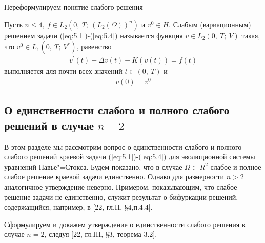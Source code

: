 Переформулируем понятие слабого решения
\begin{definition}
    Пусть $n \le 4, \ f \in L_2(0, \ T; \ (L_2(\Omega))^n)$ и $v^0 \in H$. Слабым (вариационным) решением задачи (\ref{eq:5.1})-(\ref{eq:5.4}) называется функция
    $v \in L_2(0, \ T; \ V)$ такая, что $v^0 \in L_1(0, \ T; \ V^\ast)$, равенство
    \begin{equation}\label{eq:5.11}
        \begin{gathered}
            v^\prime(t) - \Delta v(t) - K(v(t)) = f(t)
        \end{gathered}
    \end{equation}
    выполняется для почти всех значений $t \in (0, \ T)$ и
    \begin{equation}\label{eq:5.12}
        \begin{gathered}
            v(0) = v^0
        \end{gathered}
    \end{equation}
\end{definition}


\subsection {О единственности слабого и полного слабого решений в случае $n = 2$}
В этом разделе мы рассмотрим вопрос о единственности слабого и полного слабого решений краевой задачи (\ref{eq:5.1})-(\ref{eq:5.4}) для эволюционной
системы уравнений Навье"=Стокса. Будем показано, что в случае $\Omega \subset R^2$ слабое и полное слабое решение краевой задачи единственно.
Однако для размерности $n > 2$ аналогичное утверждение неверно. Примером, показывающим, что слабое решение задачи не единственно, служит результат
о бифуркации решений, содержащийся, например, в [22, гл.II, \S 4,п.4.4].

Сформулируем и докажем утверждение о единственности слабого решения в случае $n = 2$, следуя [22, гл.III, \S 3, теорема 3.2].

